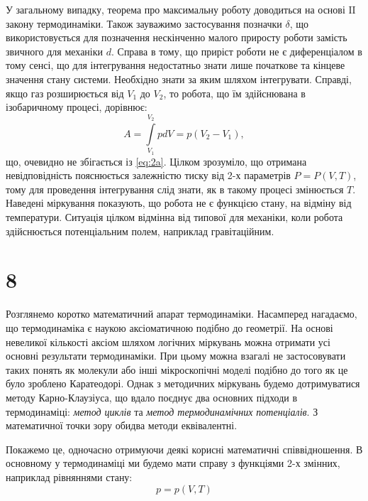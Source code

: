 У загальному випадку, теорема про максимальну роботу доводиться на основі ΙΙ закону термодинаміки. Також зауважимо застосування позначки $\delta$, що використовується для позначення нескінченно малого приросту роботи замість звичного для механіки $d$. Справа в тому, що приріст роботи не є диференціалом в тому сенсі, що для інтегрування недостатньо знати лише початкове та кінцеве значення стану системи. Необхідно знати за яким шляхом інтегрувати. Справді, якщо газ розширюється від $V_1$ до $V_2$, то робота, що їм здійснювана в ізобаричному процесі, дорівнює:
\begin{equation*}\tag{2б}
    A = \int\limits_{V_1}^{V_2} p dV = p(V_2 - V_1),
\end{equation*}
що, очевидно не збігається із \eqref{eq:2a}. Цілком зрозуміло, що отримана невідповідність пояснюється залежністю тиску від 2-х параметрів $P=P(V,T)$, тому для проведення інтегрування слід знати, як в такому процесі змінюється $T$. Наведені міркування показують, що робота не є функцією стану, на відміну від температури. Ситуація цілком відмінна від типової для механіки, коли робота здійснюється  потенціальним полем, наприклад гравітаційним.



\section{8}




Розглянемо коротко математичний апарат термодинаміки. Насамперед нагадаємо, що термодинаміка є наукою аксіоматичною подібно до геометрії. На основі невеликої кількості аксіом шляхом логічних міркувань можна отримати усі основні результати термодинаміки. При цьому можна взагалі не застосовувати таких понять як молекули або інші мікроскопічні моделі подібно до того як це було зроблено Каратеодорі. Однак з методичних міркувань будемо дотримуватися методу Карно-Клаузіуса, що вдало поєднує два основних підходи в термодинаміці: \emph{метод циклів} та \emph{метод термодинамічних потенціалів}. З математичної точки зору обидва методи еквівалентні.


Покажемо це, одночасно отримуючи деякі корисні математичні співвідношення. В основному у термодинаміці ми будемо мати справу з функціями 2-х змінних, наприклад рівняннями стану:
\begin{equation*}
    p = p(V, T)
\end{equation*}

